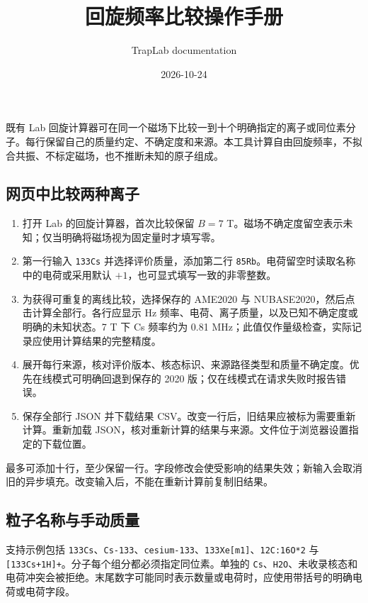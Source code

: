 \documentclass[
  aps,
  onecolumn,
  11pt]{revtex4-2}
\title{回旋频率比较操作手册}
\author{TrapLab documentation}
\date{2026-10-24}
\providecommand{\tightlist}{%
  \setlength{\itemsep}{0pt}\setlength{\parskip}{0pt}}
\begin{document}
\maketitle

既有 Lab
回旋计算器可在同一个磁场下比较一到十个明确指定的离子或同位素分子。每行保留自己的质量约定、不确定度和来源。本工具计算自由回旋频率，不拟合共振、不标定磁场，也不推断未知的原子组成。

\subsection{网页中比较两种离子}\label{ux7f51ux9875ux4e2dux6bd4ux8f83ux4e24ux79cdux79bbux5b50}

\begin{enumerate}
\def\labelenumi{\arabic{enumi}.}
\tightlist
\item
  打开 Lab 的回旋计算器，首次比较保留 \(B=7\)
  T。磁场不确定度留空表示未知；仅当明确将磁场视为固定量时才填写零。
\item
  第一行输入 \texttt{133Cs} 并选择评价质量，添加第二行
  \texttt{85Rb}。电荷留空时读取名称中的电荷或采用默认
  \(+1\)，也可显式填写一致的非零整数。
\item
  为获得可重复的离线比较，选择保存的 AME2020 与
  NUBASE2020，然后点击计算全部行。各行应显示 Hz
  频率、电荷、离子质量，以及已知不确定度或明确的未知状态。7 T 下 Cs
  频率约为 0.81
  MHz；此值仅作量级检查，实际记录应使用计算结果的完整精度。
\item
  展开每行来源，核对评价版本、核态标识、来源路径类型和质量不确定度。优先在线模式可明确回退到保存的
  2020 版；仅在线模式在请求失败时报告错误。
\item
  保存全部行 JSON 并下载结果
  CSV。改变一行后，旧结果应被标为需要重新计算。重新加载
  JSON，核对重新计算的结果与来源。文件位于浏览器设置指定的下载位置。
\end{enumerate}

最多可添加十行，至少保留一行。字段修改会使受影响的结果失效；新输入会取消旧的异步填充。改变输入后，不能在重新计算前复制旧结果。

\subsection{粒子名称与手动质量}\label{ux7c92ux5b50ux540dux79f0ux4e0eux624bux52a8ux8d28ux91cf}

支持示例包括
\texttt{133Cs}、\texttt{Cs-133}、\texttt{cesium-133}、\texttt{133Xe{[}m1{]}}、\texttt{12C:16O*2}
与 \texttt{{[}133Cs+1H{]}+}。分子每个组分都必须指定同位素。单独的
\texttt{Cs}、\texttt{H2O}、未收录核态和电荷冲突会被拒绝。末尾数字可能同时表示数量或电荷时，应使用带括号的明确电荷或电荷字段。
\end{document}
